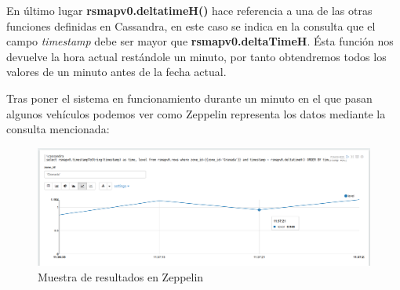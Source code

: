 En último lugar \textbf{rsmapv0.deltatimeH()} hace referencia a una de las otras funciones definidas en Cassandra, en este caso se indica en la consulta que el campo \textit{timestamp} debe ser mayor que \textbf{rsmapv0.deltaTimeH}. Ésta función nos devuelve la hora actual restándole un minuto, por tanto obtendremos todos los valores de un minuto antes de la fecha actual.

\bigskip

Tras poner el sistema en funcionamiento durante un minuto en el que pasan algunos vehículos podemos ver como Zeppelin representa los datos mediante la consulta mencionada:

\begin{figure}[!ht]
  \begin{center}
    \includegraphics[scale=0.30]{../images/zeppelin/4.png}
		\caption{Muestra de resultados en Zeppelin}
    \label{fig:kaa}
	\end{center}
\end{figure}
